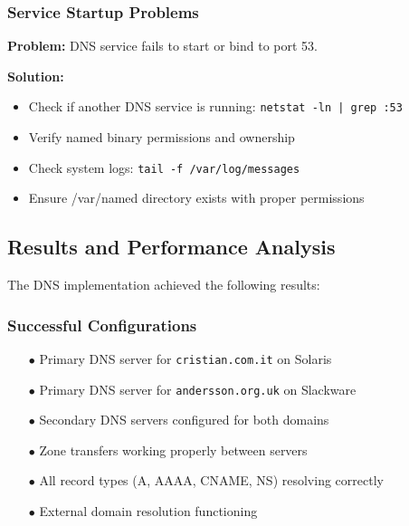 \documentclass[12pt,a4paper]{article}
\begin{document}
\subsubsection{Service Startup Problems}
\begin{tcolorbox}[title=Issue: named service not starting]
\textbf{Problem:} DNS service fails to start or bind to port 53.

\textbf{Solution:}
\begin{itemize}
    \item Check if another DNS service is running: \texttt{netstat -ln | grep :53}
    \item Verify named binary permissions and ownership
    \item Check system logs: \texttt{tail -f /var/log/messages}
    \item Ensure /var/named directory exists with proper permissions
\end{itemize}
\end{tcolorbox}

\subsection{Results and Performance Analysis}\label{subsec:results}

The DNS implementation achieved the following results:

\subsubsection{Successful Configurations}
\begin{itemize}
    \item [$\bullet$] Primary DNS server for \texttt{cristian.com.it} on Solaris
    \item [$\bullet$] Primary DNS server for \texttt{andersson.org.uk} on Slackware
    \item [$\bullet$] Secondary DNS servers configured for both domains
    \item [$\bullet$] Zone transfers working properly between servers
    \item [$\bullet$] All record types (A, AAAA, CNAME, NS) resolving correctly
    \item [$\bullet$] External domain resolution functioning
\end{itemize}
\end{document}
